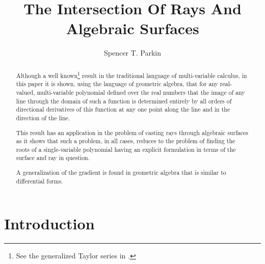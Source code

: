 \documentclass{birkjour}
\theoremstyle{definition}
\theoremstyle{remark}
\numberwithin{equation}{section}
\begin{document}
%
%
%
%
%
%
%
%

\title{The Intersection Of Rays And\\Algebraic Surfaces}

\author{Spencer T. Parkin}
\address{102 W. 500 S., Salt Lake City, UT  84101}




\begin{abstract}
Although a well known\footnote{See the generalized Taylor series in \cite{Weisstein13}.} result in the traditional language of multi-variable calculus,
in this paper it is shown, using the language of geometric algebra, that for any
real-valued, multi-variable polynomial defined over the
real numbers that the image of any line through the domain of such a function
is determined entirely by all orders of directional derivatives of this function at
any one point along the line and in the direction of the line.

This result has an
application in the problem of casting rays through algebraic surfaces as it
shows that such a problem, in all cases, reduces to the problem of finding
the roots of a single-variable polynomial having an explicit formulation
in terms of the surface and ray in question.

A generalization of the gradient is found in geometric algebra that is
similar to differential forms.
\end{abstract}

\maketitle

\section{Introduction}
\end{document}
